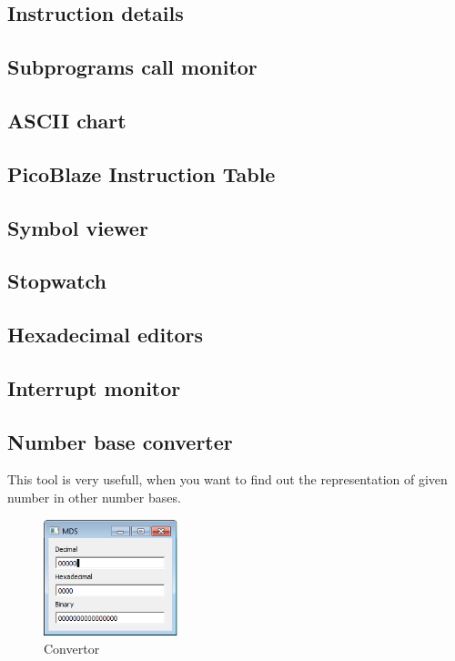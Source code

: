                 \subsection{Instruction details}
                \subsection{Subprograms call monitor}
                \subsection{ASCII chart}
                \subsection{PicoBlaze Instruction Table}
                \subsection{Symbol viewer}
                \subsection{Stopwatch}

                \subsection{Hexadecimal editors }
                \subsection{Interrupt monitor}

                \subsection{Number base converter}
                This tool is very usefull, when you want to find out the representation of given number in other
                number bases.

                        \begin{figure}
                                \centering
                                \includegraphics[width=110pt]{img/convertor.png}
                                \caption{Convertor}
                        \end{figure}

